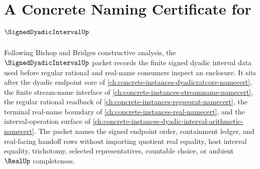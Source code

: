 \chapter{A Concrete Naming Certificate for $\SignedDyadicIntervalUp$}
\label{ch:concrete-instances-signed-dyadic-interval-namecert}

Following Bishop and Bridges constructive analysis, the $\SignedDyadicIntervalUp$ packet records the finite signed dyadic interval data used before regular rational and real-name consumers inspect an enclosure. It sits after the dyadic endpoint core of \autoref{ch:concrete-instances-dyadicratcore-namecert}, the finite stream-name interface of \autoref{ch:concrete-instances-streamname-namecert}, the regular rational readback of \autoref{ch:concrete-instances-regseqrat-namecert}, the terminal real-name boundary of \autoref{ch:concrete-instances-real-namecert}, and the interval-operation surface of \autoref{ch:concrete-instances-dyadic-interval-arithmetic-namecert}. The packet names the signed endpoint order, containment ledger, and real-facing handoff rows without importing quotient real equality, host interval equality, trichotomy, selected representatives, countable choice, or ambient $\RealUp$ completeness.

